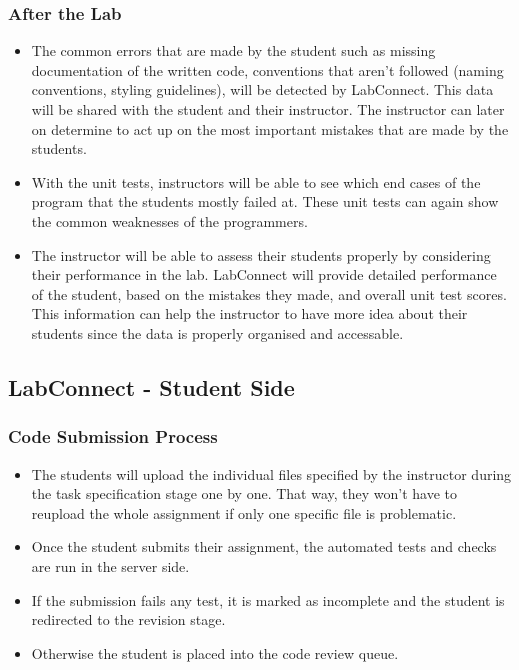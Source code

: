 \documentclass[a4paper, 12pt]{article}
\begin{document}
    \subsubsection{After the Lab}

    \begin{itemize}
        \item The common errors that are made by the student such as missing documentation
        of the written code, conventions that aren't followed (naming conventions, styling
        guidelines), will be detected by LabConnect. This data will be shared with the student
        and their instructor. The instructor can later on determine to act up on the most
        important mistakes that are made by the students.
        \item With the unit tests, instructors will be able to see which end cases of the program
        that the students mostly failed at. These unit tests can again show the common weaknesses
        of the programmers.
        \item The instructor will be able to assess their students properly by considering their
        performance in the lab. LabConnect will provide detailed performance of the student,
        based on the mistakes they made, and overall unit test scores. This information can help
        the instructor to have more idea about their students since the data is properly organised
        and accessable.
    \end{itemize}

    \subsection{LabConnect - Student Side}

    \subsubsection{Code Submission Process}

    \begin{itemize}
      \item The students will upload the individual files specified by the instructor during the task specification
      stage one by one. That way, they won't have to reupload the whole assignment if only one specific file is problematic.
      \item Once the student submits their assignment, the automated tests and checks are run in the server side.
      \item If the submission fails any test, it is marked as incomplete and the student is redirected to the revision stage.
      \item Otherwise the student is placed into the code review queue.
    \end{itemize}
\end{document}
